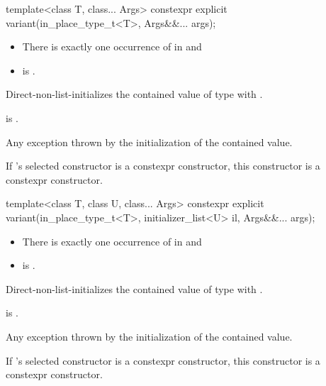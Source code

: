 %
\begin{itemdecl}
template<class T, class... Args> constexpr explicit variant(in_place_type_t<T>, Args&&... args);
\end{itemdecl}

\begin{itemdescr}
\pnum
\constraints
\begin{itemize}
\item There is exactly one occurrence of  in  and
\item {} is .
\end{itemize}

\pnum
\effects
Direct-non-list-initializes the contained value of type 
with .

\pnum
\ensures
{} is .

\pnum
\throws
Any exception thrown by
the initialization of the contained value.

\pnum
\remarks
If 's selected constructor is a constexpr constructor, this
constructor is a constexpr constructor.
\end{itemdescr}

%
\begin{itemdecl}
template<class T, class U, class... Args>
  constexpr explicit variant(in_place_type_t<T>, initializer_list<U> il, Args&&... args);
\end{itemdecl}

\begin{itemdescr}
\pnum
\constraints
\begin{itemize}
\item There is exactly one occurrence of  in  and
\item {} is .
\end{itemize}

\pnum
\effects
Direct-non-list-initializes the contained value of type 
with .

\pnum
\ensures
{} is .

\pnum
\throws
Any exception thrown by
the initialization of the contained value.

\pnum
\remarks
If 's selected constructor is a constexpr constructor, this
constructor is a constexpr constructor.
\end{itemdescr}

